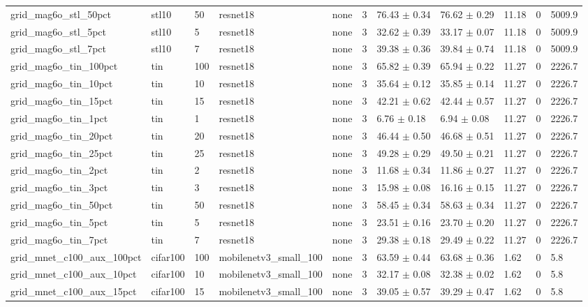 \begin{tabular}{lllllllllll}
grid_mag6o_stl_50pct & stl10 & 50 & resnet18 & none & 3 & 76.43 $\pm$ 0.34 & 76.62 $\pm$ 0.29 & 11.18 & 0 & 5009.9 \\
grid_mag6o_stl_5pct & stl10 & 5 & resnet18 & none & 3 & 32.62 $\pm$ 0.39 & 33.17 $\pm$ 0.07 & 11.18 & 0 & 5009.9 \\
grid_mag6o_stl_7pct & stl10 & 7 & resnet18 & none & 3 & 39.38 $\pm$ 0.36 & 39.84 $\pm$ 0.74 & 11.18 & 0 & 5009.9 \\
grid_mag6o_tin_100pct & tin & 100 & resnet18 & none & 3 & 65.82 $\pm$ 0.39 & 65.94 $\pm$ 0.22 & 11.27 & 0 & 2226.7 \\
grid_mag6o_tin_10pct & tin & 10 & resnet18 & none & 3 & 35.64 $\pm$ 0.12 & 35.85 $\pm$ 0.14 & 11.27 & 0 & 2226.7 \\
grid_mag6o_tin_15pct & tin & 15 & resnet18 & none & 3 & 42.21 $\pm$ 0.62 & 42.44 $\pm$ 0.57 & 11.27 & 0 & 2226.7 \\
grid_mag6o_tin_1pct & tin & 1 & resnet18 & none & 3 & 6.76 $\pm$ 0.18 & 6.94 $\pm$ 0.08 & 11.27 & 0 & 2226.7 \\
grid_mag6o_tin_20pct & tin & 20 & resnet18 & none & 3 & 46.44 $\pm$ 0.50 & 46.68 $\pm$ 0.51 & 11.27 & 0 & 2226.7 \\
grid_mag6o_tin_25pct & tin & 25 & resnet18 & none & 3 & 49.28 $\pm$ 0.29 & 49.50 $\pm$ 0.21 & 11.27 & 0 & 2226.7 \\
grid_mag6o_tin_2pct & tin & 2 & resnet18 & none & 3 & 11.68 $\pm$ 0.34 & 11.86 $\pm$ 0.27 & 11.27 & 0 & 2226.7 \\
grid_mag6o_tin_3pct & tin & 3 & resnet18 & none & 3 & 15.98 $\pm$ 0.08 & 16.16 $\pm$ 0.15 & 11.27 & 0 & 2226.7 \\
grid_mag6o_tin_50pct & tin & 50 & resnet18 & none & 3 & 58.45 $\pm$ 0.34 & 58.63 $\pm$ 0.34 & 11.27 & 0 & 2226.7 \\
grid_mag6o_tin_5pct & tin & 5 & resnet18 & none & 3 & 23.51 $\pm$ 0.16 & 23.70 $\pm$ 0.20 & 11.27 & 0 & 2226.7 \\
grid_mag6o_tin_7pct & tin & 7 & resnet18 & none & 3 & 29.38 $\pm$ 0.18 & 29.49 $\pm$ 0.22 & 11.27 & 0 & 2226.7 \\
grid_mnet_c100_aux_100pct & cifar100 & 100 & mobilenetv3_small_100 & none & 3 & 63.59 $\pm$ 0.44 & 63.68 $\pm$ 0.36 & 1.62 & 0 & 5.8 \\
grid_mnet_c100_aux_10pct & cifar100 & 10 & mobilenetv3_small_100 & none & 3 & 32.17 $\pm$ 0.08 & 32.38 $\pm$ 0.02 & 1.62 & 0 & 5.8 \\
grid_mnet_c100_aux_15pct & cifar100 & 15 & mobilenetv3_small_100 & none & 3 & 39.05 $\pm$ 0.57 & 39.29 $\pm$ 0.47 & 1.62 & 0 & 5.8 \\

\end{tabular}
